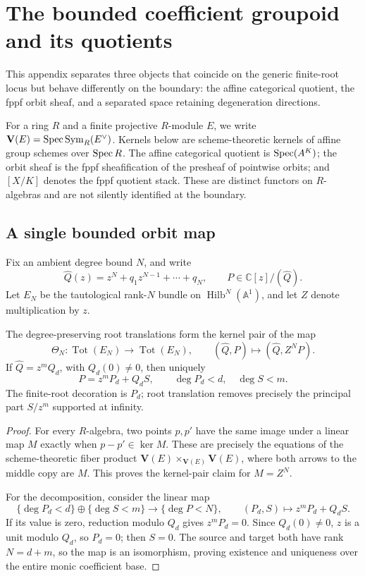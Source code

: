\section{The bounded coefficient groupoid and its quotients}
\label{app:categorical-boundary-quotient}

This appendix separates three objects that coincide on the generic
finite-root locus but behave differently on the boundary: the affine
categorical quotient, the fppf orbit sheaf, and a separated space retaining
degeneration directions.

For a ring \(R\) and a finite projective \(R\)-module \(E\), we write
\(\mathbf V(E)=\operatorname{Spec}\operatorname{Sym}_R(E^\vee)\).  Kernels below are
scheme-theoretic kernels of affine group schemes over \(\operatorname{Spec} R\).  The
affine categorical quotient is \(\operatorname{Spec}(A^K)\); the orbit sheaf is the fppf
sheafification of the presheaf of pointwise orbits; and \([X/K]\) denotes
the fppf quotient stack.  These are distinct functors on \(R\)-algebras and
are not silently identified at the boundary.

\subsection{A single bounded orbit map}

Fix an ambient degree bound \(N\), and write
\[
\widehat Q(z)=z^N+q_1z^{N-1}+\cdots+q_N,\qquad
P\in\mathbb C[z]/(\widehat Q).
\]
Let \(E_N\) be the tautological rank-\(N\) bundle on
\(\operatorname{Hilb}^N(\mathbb A^1)\), and let \(Z\) denote multiplication by
\(z\).

\begin{proposition}
\label{prop:bounded-root-translation-groupoid}
The degree-preserving root translations form the kernel pair of the map
\[
\Theta_N\colon\operatorname{Tot}(E_N)\longrightarrow
\operatorname{Tot}(E_N),
\qquad
(\widehat Q,P)\longmapsto(\widehat Q,Z^NP).
\]
If \(\widehat Q=z^mQ_d\), with \(Q_d(0)\ne0\), then uniquely
\[
P=z^mP_d+Q_dS,\qquad \deg P_d<d,\quad\deg S<m.
\]
The finite-root decoration is \(P_d\); root translation removes precisely
the principal part \(S/z^m\) supported at infinity.
\end{proposition}

\begin{proof}
For every \(R\)-algebra, two points \(p,p'\) have the same image under a
linear map \(M\) exactly when \(p-p'\in\ker M\).  These are precisely the
equations of the scheme-theoretic fiber product
\(\mathbf V(E)\times_{\mathbf V(E)}\mathbf V(E)\), where both arrows to the
middle copy are \(M\).  This proves the kernel-pair claim for \(M=Z^N\).

For the decomposition, consider the linear map
\[
\{\deg P_d<d\}\oplus\{\deg S<m\}
\longrightarrow \{\deg P<N\},
\qquad (P_d,S)\longmapsto z^mP_d+Q_dS.
\]
If its value is zero, reduction modulo \(Q_d\) gives
\(z^mP_d=0\).  Since \(Q_d(0)\ne0\), \(z\) is a unit modulo \(Q_d\), so
\(P_d=0\); then \(S=0\).  The source and target both have rank \(N=d+m\),
so the map is an isomorphism, proving existence and uniqueness over the
entire monic coefficient base.
\end{proof}


